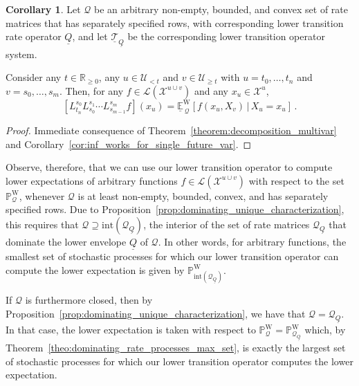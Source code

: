 \documentclass[10pt,a4paper]{paper}
\theoremstyle{definition}
\newtheorem{corollary}[theorem]{Corollary}
\newcommand{\reals}{\mathbb{R}}
\newcommand{\realsnonneg}{\reals_{\geq 0}}
\newcommand{\states}{\mathcal{X}}
\newcommand{\processes}{\mathbb{P}}
\newcommand{\wprocesses}{\processes^{\mathrm{W}}}
\newcommand{\gambles}{\mathcal{L}}
\newcommand{\rateset}{\mathcal{Q}}
\newcommand{\lrate}{\underline{Q}}
\begin{document}


\begin{corollary}\label{cor:composition_lower_trans}
Let $\rateset$ be an arbitrary non-empty, bounded, and convex set of rate matrices that has separately specified rows, with corresponding lower transition rate operator $\lrate$, and let $\underline{\mathcal{T}}_{\lrate}$ be the corresponding lower transition operator system. 

Consider any $t\in\realsnonneg$, any $u\in\mathcal{U}_{<t}$ and $v\in\mathcal{U}_{\geq t}$ with $u=t_0,\ldots,t_n$ and $v={s_0,\ldots,s_m}$. Then, for any $f\in\gambles(\states^{u\cup v})$ and any $x_u\in\states^u$,
\begin{equation}\label{eq:composition_lower_trans}
\left[L_{t_n}^{s_0}L_{s_0}^{s_1}\cdots L_{s_{m-1}}^{s_m}f\right](x_u) = \underline{\mathbb{E}}^{\mathrm{W}}_{\,\rateset}[f(x_u,X_v)\,\vert\,X_u=x_u]\,.
\end{equation}
\end{corollary}
\begin{proof}
Immediate consequence of Theorem~\ref{theorem:decomposition_multivar} and Corollary~\ref{cor:inf_works_for_single_future_var}.
\end{proof}

Observe, therefore, that we can use our lower transition operator to compute lower expectations of arbitrary functions $f\in\gambles(\states^{u\cup v})$ with respect to the set $\wprocesses_\rateset$, whenever $\rateset$ is at least non-empty, bounded, convex, and has separately specified rows. Due to Proposition~\ref{prop:dominating_unique_characterization}, this requires that $\rateset\supseteq\text{int}(\rateset_{\lrate})$, the interior of the set of rate matrices $\rateset_{\lrate}$ that dominate the lower envelope $\lrate$ of $\rateset$. In other words, for arbitrary functions, the smallest set of stochastic processes for which our lower transition operator can compute the lower expectation is given by $\wprocesses_{\text{int}(\rateset_{\lrate})}$.

If $\rateset$ is furthermore closed, then by Proposition~\ref{prop:dominating_unique_characterization}, we have that $\rateset=\rateset_{\lrate}$. In that case, the lower expectation is taken with respect to $\wprocesses_\rateset=\wprocesses_{\rateset_{\lrate}}$ which, by Theorem~\ref{theo:dominating_rate_processes_max_set}, is exactly the largest set of stochastic processes for which our lower transition operator computes the lower expectation.
\end{document}
